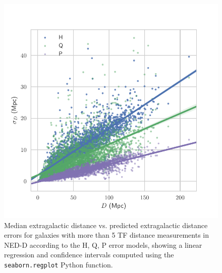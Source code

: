 \documentclass[a4paper,fleqn,usenatbib]{mnras}
\begin{document}
\begin{figure}

	\includegraphics[scale=0.7]{hqp}
    \caption{Median extragalactic distance vs. predicted extragalactic distance errors for galaxies with more than 5 TF distance measurements in NED-D according to the H, Q, P error models, showing a linear regression and confidence intervals computed using the \texttt{seaborn.regplot} Python function.}
    \label{fig:hqp}
\end{figure}
\end{document}
